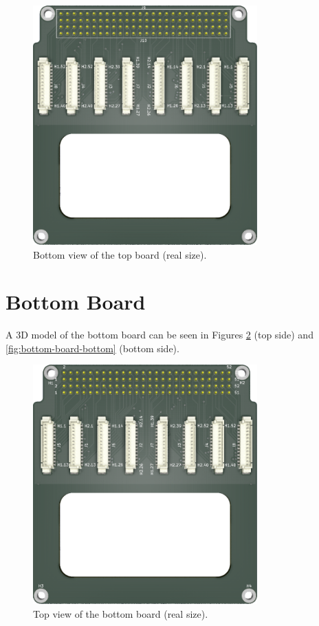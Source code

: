\begin{figure}[!htb]
    \begin{center}
        \includegraphics[width=8.636cm]{figures/pc104-adapter-top-bottom}
        \caption{Bottom view of the top board (real size).}
        \label{fig:top-board-bottom}
    \end{center}
\end{figure}

\section{Bottom Board}

A 3D model of the bottom board can be seen in Figures \ref{fig:bottom-board-top} (top side) and \ref{fig:bottom-board-bottom} (bottom side).

\begin{figure}[!htb]
    \begin{center}
        \includegraphics[width=8.626cm]{figures/pc104-adapter-bottom-top}
        \caption{Top view of the bottom board (real size).}
        \label{fig:bottom-board-top}
    \end{center}
\end{figure}

